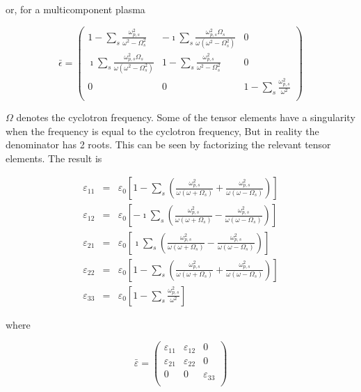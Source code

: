 \documentclass[a4paper,11pt]{article}
\begin{document}
or, for a multicomponent plasma

\begin{equation}
 \label{gyrotropic_tensor3_collless_multi_comp}
 \bar{\epsilon}=\left(%
 \begin{array}{ccc}
 1-\sum_s \frac{\omega_{p,s}^2}{\omega^2 -\Omega_s^2} & - \imath \sum_s \frac{\omega_{p,s}^2 \Omega_s}{\omega(\omega^2-\Omega_s^2)} & 0 \\
 \imath \sum_s \frac{\omega_{p,s}^2 \Omega_s}{\omega(\omega^2-\Omega_s^2)} & 1- \sum_s \frac{\omega_{p,s}^2}{\omega^2 -\Omega_s^2} & 0 \\
 0 & 0 & 1- \sum_s \frac{\omega_{p,s}^2}{\omega^2} \\
 \end{array}
  \right)
  \end{equation}

$\Omega$ denotes the cyclotron frequency. Some of the tensor elements have a singularity when the frequency is equal to the cyclotron frequency, But in reality the denominator has 2 roots. This can be seen by factorizing the relevant tensor elements. The result is

\begin{eqnarray}
 \varepsilon_{11}&=&\varepsilon_0 \left[ 1-\sum_s \left( \frac{\omega_{p,s}^2}{\omega (\omega +\Omega_s)}+\frac{\omega_{p,s}^2}{\omega (\omega -\Omega_s)} \right)\right] \\
 \varepsilon_{12}&=&\varepsilon_0 \left[ -\imath \sum_s\left( \frac{\omega_{p,s}^2}{\omega (\omega +\Omega_s)}-\frac{\omega_{p,s}^2}{\omega (\omega -\Omega_s)} \right)\right] \\
 \varepsilon_{21}&=&\varepsilon_0 \left[ \imath \sum_s \left( \frac{\omega_{p,s}^2}{\omega (\omega +\Omega_s)}-\frac{\omega_{p,s}^2}{\omega (\omega -\Omega_s)} \right)\right] \\
 \varepsilon_{22}&=&\varepsilon_0 \left[ 1-\sum_s \left( \frac{\omega_{p,s}^2}{\omega (\omega +\Omega_s)}+\frac{\omega_{p,s}^2}{\omega (\omega -\Omega_s)} \right)\right] \\
 \varepsilon_{33}&=&\varepsilon_0 \left[ 1-\sum_s \frac{\omega_{p,s}^2}{\omega^2}\right]
\end{eqnarray}

where

\begin{equation}
 \bar{\varepsilon}=\left(
 \begin{array}{ccc}
  \varepsilon_{11} & \varepsilon_{12} & 0 \\
\varepsilon_{21}  & \varepsilon_{22} & 0 \\
 0 & 0 &  \varepsilon_{33}\\
 \end{array}
  \right)
  \end{equation}\\
\end{document}
